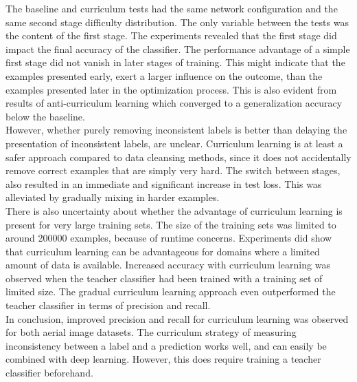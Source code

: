 The baseline and curriculum tests had the same network configuration and the same second stage difficulty distribution. The only variable between the tests was the content of the first stage. The experiments revealed that the first stage did impact the final accuracy of the classifier. The performance advantage of a simple first stage did not vanish in later stages of training. This might indicate that the examples presented early, exert a larger influence on the outcome, than the examples presented later in the optimization process. This is also evident from results of anti-curriculum learning which converged to a generalization accuracy below the baseline. \\

However, whether purely removing inconsistent labels is  better than delaying the presentation of inconsistent labels, are  unclear. Curriculum learning is at least a safer approach compared to data cleansing methods, since it does not accidentally remove correct examples that are simply very hard. The switch between stages, also resulted in an immediate and significant increase in test loss. This was alleviated by gradually mixing in harder examples.\\

There is also uncertainty about whether the advantage of curriculum learning is present for very large training sets. The size of the training sets was limited to around 200000 examples, because of runtime concerns. Experiments did show that curriculum learning can be advantageous for domains where a limited amount of data is available. Increased accuracy with curriculum learning was observed when the teacher classifier had been trained with a training set of limited size. The gradual curriculum learning approach even outperformed the teacher classifier in terms of precision and recall.\\

In conclusion, improved precision and recall for curriculum learning was observed for both aerial image datasets. The curriculum strategy of measuring inconsistency between a label and a prediction works well, and can easily be combined with deep learning. However, this does  require training a teacher classifier beforehand.


